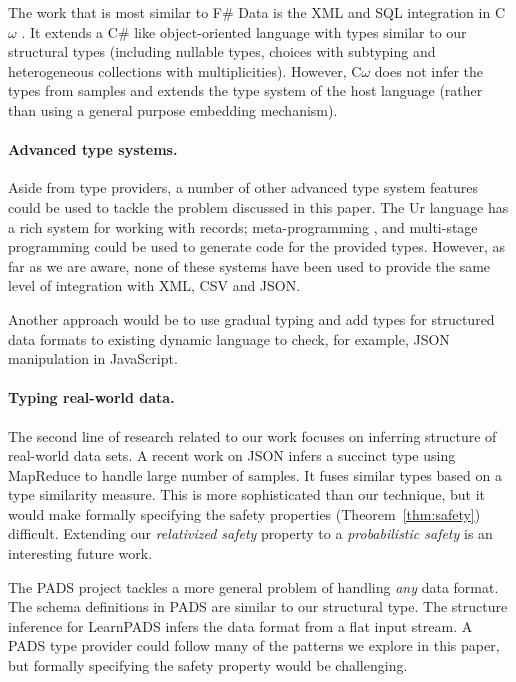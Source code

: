 \documentclass[preprint]{sigplanconf}
\begin{document}
The work that is most similar to F\# Data is the XML and SQL integration in C$\omega$ \cite{comega-xs}.
It extends a C\# like object-oriented language with types similar to our structural types 
(including nullable types, choices with subtyping and heterogeneous collections with multiplicities).
However, C$\omega$ does not infer the types from samples and extends the type system of the host
language (rather than using a general purpose embedding mechanism).

\paragraph{Advanced type systems.}
Aside from type providers, a number of other advanced type system features could be used to
tackle the problem discussed in this paper. The Ur \cite{ur} language has a rich system for working
with records; meta-programming \cite{template-hask}, \cite{th-camlp4} and multi-stage programming \cite{multi-stage}
could be used to generate code for the provided types. However, as far as we are aware, none of these 
systems have been used to provide the same level of integration with XML, CSV and JSON.

Another approach would be to use gradual typing \cite{gradual,gradual-js} and add types for structured
data formats to existing dynamic language to check, for example, JSON manipulation in JavaScript.

\paragraph{Typing real-world data.}
The second line of research related to our work focuses on inferring structure of real-world data sets.
A recent work on JSON \cite{typing-json} infers a succinct type using MapReduce to handle large number
of samples. It fuses similar types based on a type similarity measure. This is more sophisticated than
our technique, but it would make formally specifying the safety properties (Theorem~\ref{thm:safety}) difficult.
Extending our \emph{relativized safety} property to a \emph{probabilistic safety} is an interesting 
future work.

The PADS project \cite{pads-dsl,pads-ml} tackles a more general problem of handling \emph{any} data format.
The schema definitions in PADS are similar to our structural type. The structure inference for LearnPADS
\cite{pads-learn} infers the data format from a flat input stream. A PADS type provider could follow
many of the patterns we explore in this paper, but formally specifying the safety property would be
challenging.
\end{document}
